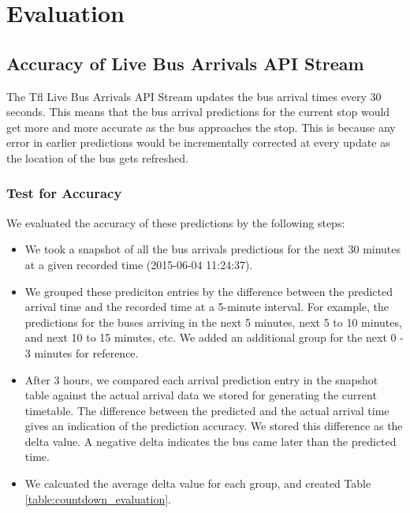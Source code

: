 \chapter{Evaluation}
\label{ch:evaluation}
\section{Accuracy of Live Bus Arrivals API Stream}
\label{sec:tfl_stream_accuracy}
\par The Tfl Live Bus Arrivals API Stream updates the bus arrival times every 30 seconds. This means that the bus arrival predictions for the current stop would get more and more accurate as the bus approaches the stop. This is because any error in earlier predictions would be incrementally corrected at every update as the location of the bus gets refreshed.

\subsection{Test for Accuracy}
\par We evaluated the accuracy of these predictions by the following steps:

\begin{itemize}
  \item We took a snapshot of all the bus arrivals predictions for the next 30 minutes at a given recorded time (2015-06-04 11:24:37).
  \item We grouped these prediciton entries by the difference between the predicted arrival time and the recorded time at a 5-minute interval. For example, the predictions for the buses arriving in the next 5 minutes, next 5 to 10 minutes, and next 10 to 15 minutes, etc. We added an additional group for the next 0 - 3 minutes for reference.
  \item After 3 hours, we compared each arrival prediction entry in the snapshot table against the actual arrival data we stored for generating the current timetable. The difference between the predicted and the actual arrival time gives an indication of the prediction accuracy. We stored this difference as the delta value. A negative delta indicates the bus came later than the predicted time.
  \item We calcuated the average delta value for each group, and created Table \ref{table:countdown_evaluation}.
\end{itemize}

